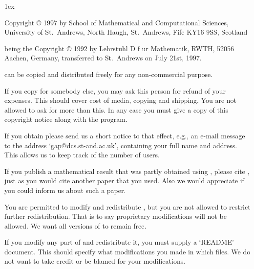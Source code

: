 


\begingroup
\def\"#1{\accent127 #1}
\parindent 0pt
\parskip 1ex

{\everypar{\hangindent\manindent}
Copyright {\copyright} 1997 by
        School of Mathematical and Computational Sciences,
        University of St.~Andrews,\hfill\break
        North Haugh, St.~Andrews, Fife KY16 9SS, Scotland

being the Copyright {\copyright} 1992 by
        Lehrstuhl D f\"ur Mathematik, RWTH,
        52056 Aachen, Germany,\hfill\break
transferred to St.~Andrews on July 21st, 1997.\par}

\medskip

{\GAP}   can be copied   and  distributed freely  for any  non-commercial
purpose.

If you copy {\GAP} for somebody else, you may ask this person for  refund
of your expenses.  This should cover cost of media, copying and shipping.
You are not allowed to ask for more than this.  In any case you must give
a copy of this copyright notice along with the program.

If you obtain {\GAP} please send us  a short notice to that effect, e.g.,
an  e-mail  message   to  the  address  `gap@dcs.st-and.ac.uk',
containing your full  name and address.  This  allows us to keep track of
the number of {\GAP} users.

If you  publish  a mathematical  result  that  was  partly obtained using
{\GAP}, please cite {\GAP}, just as you would cite another paper that you
used.\* Also   we would appreciate if you   could inform us  about such a
paper.

You  are permitted  to modify and  redistribute  {\GAP},  but you are not
allowed  to restrict further redistribution.  That is to say  proprietary
modifications will  not  be allowed.  We want all  versions  of {\GAP} to
remain free.

If you  modify any part of {\GAP} and redistribute it,  you must supply a
`README'  document.   This should specify what modifications you made  in
which  files.  We do  not  want  to take  credit  or  be blamed  for your
modifications.


